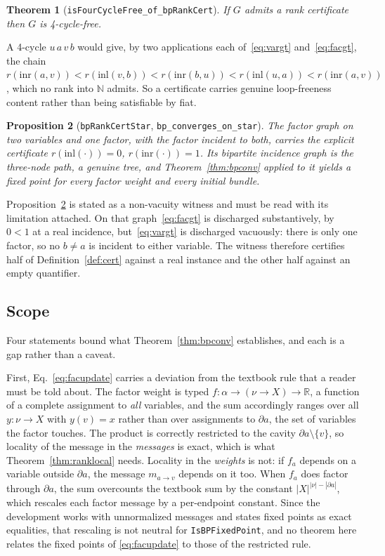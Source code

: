 \documentclass[aps,prx,reprint,nofootinbib,floatfix]{revtex4-2}
\newtheorem{thm}{Theorem}
\newtheorem{prop}[thm]{Proposition}
\begin{document}
\begin{thm}[\texttt{isFourCycleFree\_of\_bpRankCert}]
\label{thm:certc4}
If $G$ admits a rank certificate then $G$ is 4-cycle-free.
\end{thm}

A 4-cycle $u\,a\,v\,b$ would give, by two applications each
of~\eqref{eq:vargt} and~\eqref{eq:facgt}, the chain
$r(\mathrm{inr}(a,v)) < r(\mathrm{inl}(v,b)) < r(\mathrm{inr}(b,u)) <
r(\mathrm{inl}(u,a)) < r(\mathrm{inr}(a,v))$, which no rank into $\mathbb{N}$
admits. So a certificate carries genuine loop-freeness content rather than
being satisfiable by fiat.

\begin{prop}[\texttt{bpRankCertStar}, \texttt{bp\_converges\_on\_star}]
\label{prop:star}
The factor graph on two variables and one factor, with the factor incident to
both, carries the explicit certificate $r(\mathrm{inl}(\cdot)) = 0$,
$r(\mathrm{inr}(\cdot)) = 1$. Its bipartite incidence graph is the three-node
path, a genuine tree, and Theorem~\ref{thm:bpconv} applied to it yields a
fixed point for every factor weight and every initial bundle.
\end{prop}

Proposition~\ref{prop:star} is stated as a non-vacuity witness and must be read
with its limitation attached. On that graph~\eqref{eq:facgt} is discharged
substantively, by $0 < 1$ at a real incidence, but~\eqref{eq:vargt} is
discharged vacuously: there is only one factor, so no $b \neq a$ is incident to
either variable. The witness therefore certifies half of
Definition~\ref{def:cert} against a real instance and the other half against an
empty quantifier.

\subsection{Scope}
\label{sec:conv-scope}

Four statements bound what Theorem~\ref{thm:bpconv} establishes, and each is a
gap rather than a caveat.

First, Eq.~\eqref{eq:facupdate} carries a deviation from the textbook rule that
a reader must be told about. The factor weight is typed
$f : \alpha \to (\nu \to X) \to \mathbb{R}$, a function of a complete
assignment to \emph{all} variables, and the sum accordingly ranges over all
$y : \nu \to X$ with $y(v) = x$ rather than over assignments to $\partial a$,
the set of variables the factor touches. The product is correctly restricted to
the cavity $\partial a \setminus \{v\}$, so locality of the message in the
\emph{messages} is exact, which is what Theorem~\ref{thm:ranklocal} needs.
Locality in the \emph{weights} is not: if
$f_a$ depends on a variable outside $\partial a$, the message
$m_{a \to v}$ depends on it too. When $f_a$ does factor through
$\partial a$, the sum overcounts the textbook sum by the constant
$|X|^{|\nu| - |\partial a|}$, which rescales each factor message by a
per-endpoint constant. Since the development works with unnormalized messages
and states fixed points as exact equalities, that rescaling is not neutral for
\texttt{IsBPFixedPoint}, and no theorem here relates the fixed points of
\eqref{eq:facupdate} to those of the restricted rule.
\end{document}
